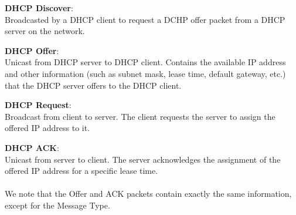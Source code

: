 \textbf{DHCP Discover}: \\
Broadcasted by a DHCP client to request a DCHP offer packet from a DHCP server on the network.

\textbf{DHCP Offer}: \\
Unicast from DHCP server to DHCP client. Contains the available IP address and other information (such as subnet mask, lease time, default gateway, etc.) that the DHCP server offers to the DHCP client.

\textbf{DHCP Request}: \\
Broadcast from client to server. The client requests the server to assign the offered IP address to it.

\textbf{DHCP ACK}: \\
Unicast from server to client. The server acknowledges the assignment of the offered IP address for a specific lease time. \\
\\
We note that the Offer and ACK packets contain exactly the same information, except for the Message Type.
